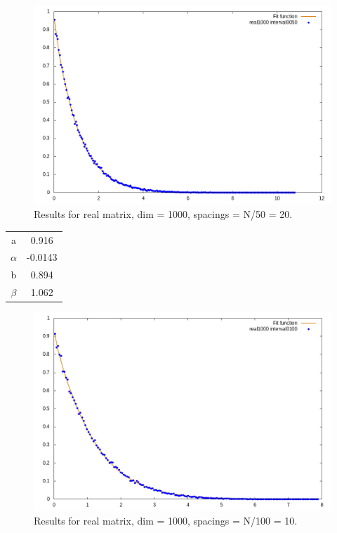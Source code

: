 \documentclass[12pt, a4paper, notitlepage]{report}
\begin{document}
\newpage

\begin{figure}[H]
	\centering
	\includegraphics[scale=0.6]{./Real_1000/hist_interval_0020_fit.png} 
	\caption{Results for real matrix, dim = 1000, spacings = N/50 = 20.}
	\label{figure_lambdas}
\end{figure}

\begin{table}[H]
	\centering
	\begin{tabular}{|c|c|}
		
		\hline

		a			& 0.916	\\
		$\alpha$	& -0.0143	\\
		b			& 0.894	\\
		$\beta$		& 1.062	\\
		
		\hline
		
	\end{tabular}
\end{table}

\newpage

\begin{figure}[H]
	\centering
	\includegraphics[scale=0.6]{./Real_1000/hist_interval_0010_fit.png} 
	\caption{Results for real matrix, dim = 1000, spacings = N/100 = 10.}
	\label{figure_lambdas}
\end{figure}
\end{document}
